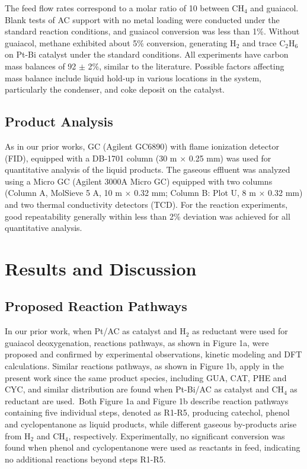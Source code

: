 \documentclass[journal=iecred,manuscript=article]{achemso}
\begin{document}
The feed flow rates correspond to a molar ratio of 10 between CH$_{4}$ and guaiacol.
Blank tests of AC support with no metal loading were conducted under the standard reaction conditions, and guaiacol conversion was less than 1\%.
Without guaiacol, methane exhibited about 5\% conversion, generating H$_{2}$ and trace C$_{2}$H$_{6}$ on Pt-Bi catalyst under the standard conditions. 
All experiments have carbon mass balances of 92 $\pm$ 2\%, similar to the literature. \cite{Chang2013, Jongerius2013} 
Possible factors affecting mass balance include liquid hold-up in various locations in the system, particularly the condenser, and coke deposit on the catalyst.

\subsection{Product Analysis}
As in our prior works, GC (Agilent GC6890) with flame ionization detector (FID),
equipped with a DB-1701 column (30 m $\times$ 0.25 mm) was used for quantitative analysis of the liquid products. \cite{Gao2014, Gao2015, Xiao2015} 
The gaseous effluent was analyzed using a Micro GC (Agilent 3000A Micro GC) 
equipped with two columns (Column A, MolSieve 5 A, 10 m $\times$ 0.32 mm; 
Column B: Plot U, 8 m $\times$ 0.32 mm) and two thermal conductivity detectors (TCD). 
For the reaction experiments, good repeatability generally within less than 2\% deviation was achieved for all quantitative analysis.

\section{Results and Discussion}
\subsection{Proposed Reaction Pathways}
In our prior work,
when Pt/AC as catalyst and H$_{2}$ as reductant were used for guaiacol deoxygenation,
reactions pathways, as shown in Figure 1a,
were proposed and confirmed by experimental observations\cite{Gao2014}, kinetic modeling and DFT calculations.\cite{Gao2015}
Similar reactions pathways, as shown in Figure 1b, 
apply in the present work since the same product species, including GUA, CAT, PHE and CYC, and similar distribution are found when
Pt-Bi/AC as catalyst and  CH$_{4}$ as reductant are used.\
Both Figure 1a and Figure 1b describe reaction pathways containing five individual steps, denoted as R1-R5,
producing catechol, phenol and cyclopentanone as liquid products,
while different gaseous by-products arise from H$_{2}$ and CH$_{4}$, respectively.
Experimentally, no significant conversion was found when phenol and cyclopentanone were used as reactants in feed, indicating no additional reactions beyond steps R1-R5. 
\end{document}
